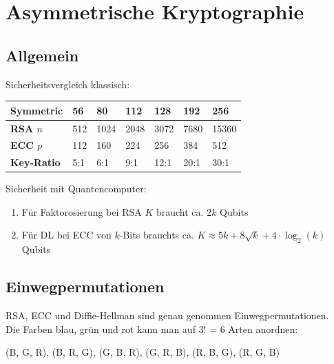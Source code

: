 \documentclass[12pt]{scrartcl}
\begin{document}
\newpage
\section{Asymmetrische Kryptographie}

\subsection{Allgemein}

Sicherheitsvergleich klassisch:
\renewcommand{\arraystretch}{1.5}
\begin{center}
    \begin{tabular}{ | m{11em} | P{4em} | P{4em} | P{4em} | P{4em} | P{4em} | P{4em} |}
        \hline
        \textbf{Symmetric}   & \textbf{56}    & \textbf{80}    & \textbf{112}   & \textbf{128}   & \textbf{192}   & \textbf{256}   \\
        \hline
        \textbf{RSA $n$  }   & 512   & 1024  & 2048  & 3072  & 7680  & 15360     \\
        \hline
        \textbf{ECC $p$  }   & 112   & 160   & 224   & 256   & 384   & 512     \\
        \hline
        \textbf{Key-Ratio}   & 5:1   & 6:1   & 9:1   & 12:1  & 20:1  & 30:1     \\
        \hline
    \end{tabular}
\end{center}


\vspace{0.5cm}
Sicherheit mit Quantencomputer:
\begin{enumerate}
    \item Für Faktorosierung bei RSA $K$ braucht ca. $2k$ Qubits
    \item Für DL bei ECC von $k$-Bits brauchts ca. $K \approx 5k + 8 \sqrt{k} + 4 \cdot \log_2(k)$ Qubits
\end{enumerate}



\subsection{Einwegpermutationen}

RSA, ECC und Diffie-Hellman sind genau genommen Einwegpermutationen.\\

Die Farben blau, grün und rot kann man auf 3! = 6 Arten anordnen:

\begin{center}
    (B, G, R), (B, R, G), (G, B, R), (G, R, B), (R, B, G), (R, G, B)    
\end{center}
\end{document}
